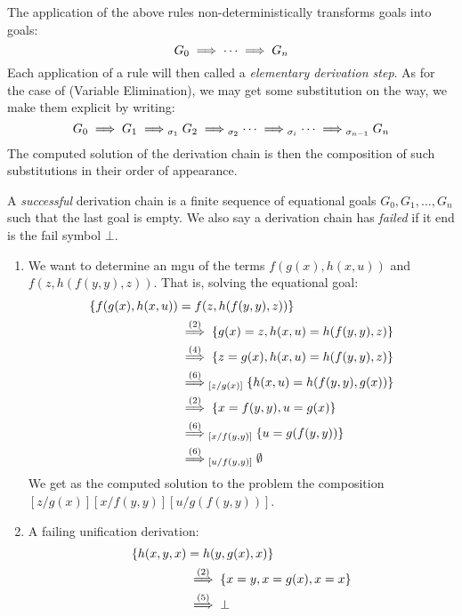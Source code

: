 The application of the above rules non-deterministically transforms goals into goals:
$$G_0 \mathrel{\implies} \cdots \mathrel{\implies} G_n$$
Each application of a rule will then called a \textit{elementary derivation step}. As for the case of (Variable Elimination), we may get some substitution on the way, we make them explicit by writing:
$$G_0 \mathrel{\implies} G_1 \mathrel{\implies}_{\sigma_1} G_2 \mathrel{\implies}_{\sigma_2} \cdots \mathrel{\implies}_{\sigma_i} \cdots \mathrel{\implies}_{\sigma_{n-1}} G_n$$
The computed solution of the derivation chain is then the composition of such substitutions in their order of appearance.

\begin{definition}
	A \textit{successful} derivation chain is a finite sequence of equational goals $G_0,G_1,\dots,G_n$ such that the last goal is empty. We also say a derivation chain has \textit{failed} if it end is the fail symbol $\bot$.
\end{definition}

\begin{example}\label{example:unif-examples}
	\begin{enumerate}
		\item We want to determine an mgu of the terms $f(g(x),h(x,u))$ and $f(z,h(f(y,y),z))$. That is, solving the equational goal:
		      \begin{align*}
			      \{ f(g(x),h(x,u)) & = f(z,h(f(y,y),z)) \}                                           \\
			                        & \overset{(2)}{\mathrel{\implies}} \{g(x) = z, h(x,u) = h(f(y,y),z)\}     \\
			                        & \overset{(4)}{\mathrel{\implies}} \{z = g(x), h(x,u) = h(f(y,y),z)\}     \\
			                        & \overset{(6)}{\mathrel{\implies}}_{[z/g(x)]} \{h(x,u) = h(f(y,y),g(x))\} \\
			                        & \overset{(2)}{\mathrel{\implies}} \{x = f(y,y), u = g(x) \}              \\
			                        & \overset{(6)}{\mathrel{\implies}}_{[x/f(y,y)]} \{ u = g(f(y,y)) \}       \\
			                        & \overset{(6)}{\mathrel{\implies}}_{[u/f(y,y)]} \emptyset
		      \end{align*}
		      We get as the computed solution to the problem the composition $[z/g(x)][x/f(y,y)][u/g(f(y,y))]$.

		\item A failing unification derivation:
		      \begin{align*}
			      \{ h(x,y,x) & = h(y,g(x),x)\}                                     \\
			                  & \overset{(2)}{\mathrel{\implies}} \{x = y, x = g(x), x = x\} \\
			                  & \overset{(5)}{\mathrel{\implies}} \bot
		      \end{align*}
	\end{enumerate}
\end{example}

